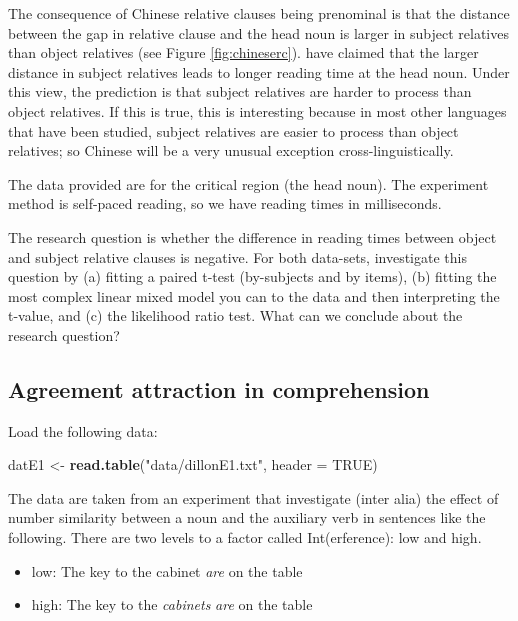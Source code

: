 \documentclass[12pt,]{krantz}
\newenvironment{Shaded}{\begin{snugshade}}{\end{snugshade}}
\newcommand{\DataTypeTok}[1]{\textcolor[rgb]{0.13,0.29,0.53}{#1}}
\newcommand{\KeywordTok}[1]{\textcolor[rgb]{0.13,0.29,0.53}{\textbf{#1}}}
\newcommand{\NormalTok}[1]{#1}
\newcommand{\OtherTok}[1]{\textcolor[rgb]{0.56,0.35,0.01}{#1}}
\newcommand{\StringTok}[1]{\textcolor[rgb]{0.31,0.60,0.02}{#1}}
\providecommand{\tightlist}{%
  \setlength{\itemsep}{0pt}\setlength{\parskip}{0pt}}
\begin{document}
The consequence of Chinese relative clauses being prenominal is that the distance between the gap in relative clause and the head noun is larger in subject relatives than object relatives (see Figure \ref{fig:chineserc}). \citet{hsiao03} have claimed that the larger distance in subject relatives leads to longer reading time at the head noun. Under this view, the prediction is that subject relatives are harder to process than object relatives. If this is true, this is interesting because in most other languages that have been studied, subject relatives are easier to process than object relatives; so Chinese will be a very unusual exception cross-linguistically.

The data provided are for the critical region (the head noun). The experiment method is self-paced reading, so we have reading times in milliseconds.

The research question is whether the difference in reading times between object and subject relative clauses is negative. For both data-sets, investigate this question by (a) fitting a paired t-test (by-subjects and by items), (b) fitting the most complex linear mixed model you can to the data and then interpreting the t-value, and (c) the likelihood ratio test. What can we conclude about the research question?

\hypertarget{sec:HypTestExerciseAgrmt}{%
\subsection{Agreement attraction in comprehension}\label{sec:HypTestExerciseAgrmt}}

Load the following data:

\begin{Shaded}
\begin{Highlighting}[]
\NormalTok{datE1 <-}\StringTok{ }\KeywordTok{read.table}\NormalTok{(}\StringTok{"data/dillonE1.txt"}\NormalTok{, }\DataTypeTok{header =} \OtherTok{TRUE}\NormalTok{)}
\end{Highlighting}
\end{Shaded}

The data are taken from an experiment that investigate (inter alia) the effect of number similarity between a noun and the auxiliary verb in sentences like the following. There are two levels to a factor called Int(erference): low and high.

\begin{itemize}
\tightlist
\item
  low: The key to the cabinet \emph{are} on the table
\item
  high: The key to the \emph{cabinets} \emph{are} on the table
\end{itemize}
\end{document}
